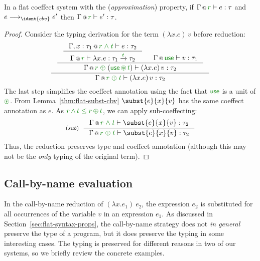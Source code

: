 \begin{theorem}
\label{thm:cbv-reduction}
In a flat coeffect system with the (\emph{approxi\-mation}) property, 
if $\coctx{\Gamma}{\cclrd{r}} \vdash e : \tau$ 
and $e \reduce_{\ident{cbv}} e'$ then $\coctx{\Gamma}{\cclrd{r}} \vdash e' : \tau$.
\end{theorem}
\begin{proof}
Consider the typing derivation for the term $(\lambda x.e)\,v$ before reduction:
\begin{equation*}
\inference
  { \inference
  { \inference
      {\coctx{\Gamma, x:\tau_1}{\cclrd{r}\;\czip\;\cclrd{t}} \vdash e : \tau_2}
      {\coctx{\Gamma}{\cclrd{r}} \vdash \lambda x.e : \tau_1 \xrightarrow{\cclrd{t}} \tau_2 } &
   \coctx{\Gamma}{\cunit} \vdash v : \tau_1 }
  {\coctx{\Gamma}{\cclrd{r} \;\cpar\; (\cunit \,\cseq\, \cclrd{t})} \vdash (\lambda x.e)\,v : \tau_2} }
  {\coctx{\Gamma}{\cclrd{r} \;\cpar\; \cclrd{t}} \vdash (\lambda x.e)\,v : \tau_2}
\end{equation*}
The last step simplifies the coeffect annotation using the fact that $\cunit$ is a unit of $\cseq$.
From Lemma~\ref{thm:flat-subst-cbv} $\subst{e}{x}{v}$ has the same coeffect annotation as $e$.
As $\cclrd{r}\,\czip\,\cclrd{t}\;\cleq\;\cclrd{r}\,\cpar\,\cclrd{t}$, we can apply sub-coeffecting:
%
\begin{equation*}
\tyrule{sub}
 { \coctx{\Gamma}{\cclrd{r}\;\czip\;\cclrd{t}} \vdash \subst{e}{x}{v} : \tau_2 }
 { \coctx{\Gamma}{\cclrd{r}\;\cpar\;\cclrd{t}} \vdash \subst{e}{x}{v} : \tau_2 } 
\end{equation*}
%
Thus, the reduction preserves type and coeffect annotation (although this may not be the
\emph{only} typing of the original term).
\end{proof}


\subsection{Call-by-name evaluation}
\label{sec:flat-syntax-cbn}

In the call-by-name reduction of $(\lambda x.e_1)~e_2$, the expression $e_2$ is substituted for all 
occurrences of the variable $v$ in an expression $e_1$. As discussed in 
Section~\ref{sec:flat-syntax-props}, the call-by-name strategy does not \emph{in general} preserve 
the type of a program, but it does preserve the typing in some interesting cases. The typing is
preserved for different reasons in two of our systems, so we briefly review the concrete examples.

